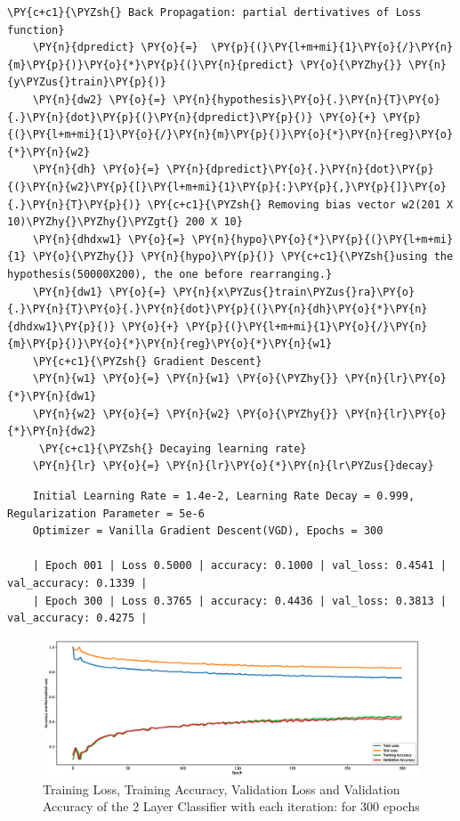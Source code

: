 \documentclass[a4paper,11pt]{article}%
\begin{document}
\begin{tcolorbox}[breakable, size=fbox, boxrule=1pt, pad at break*=1mm,colback=cellbackground, colframe=cellborder]
\begin{Verbatim}[commandchars=\\\{\}]
    \PY{c+c1}{\PYZsh{} Back Propagation: partial dertivatives of Loss function}
    \PY{n}{dpredict} \PY{o}{=}  \PY{p}{(}\PY{l+m+mi}{1}\PY{o}{/}\PY{n}{m}\PY{p}{)}\PY{o}{*}\PY{p}{(}\PY{n}{predict} \PY{o}{\PYZhy{}} \PY{n}{y\PYZus{}train}\PY{p}{)}
    \PY{n}{dw2} \PY{o}{=} \PY{n}{hypothesis}\PY{o}{.}\PY{n}{T}\PY{o}{.}\PY{n}{dot}\PY{p}{(}\PY{n}{dpredict}\PY{p}{)} \PY{o}{+} \PY{p}{(}\PY{l+m+mi}{1}\PY{o}{/}\PY{n}{m}\PY{p}{)}\PY{o}{*}\PY{n}{reg}\PY{o}{*}\PY{n}{w2}
    \PY{n}{dh} \PY{o}{=} \PY{n}{dpredict}\PY{o}{.}\PY{n}{dot}\PY{p}{(}\PY{n}{w2}\PY{p}{[}\PY{l+m+mi}{1}\PY{p}{:}\PY{p}{,}\PY{p}{]}\PY{o}{.}\PY{n}{T}\PY{p}{)} \PY{c+c1}{\PYZsh{} Removing bias vector w2(201 X 10)\PYZhy{}\PYZhy{}\PYZgt{} 200 X 10}
    \PY{n}{dhdxw1} \PY{o}{=} \PY{n}{hypo}\PY{o}{*}\PY{p}{(}\PY{l+m+mi}{1} \PY{o}{\PYZhy{}} \PY{n}{hypo}\PY{p}{)} \PY{c+c1}{\PYZsh{}using the hypothesis(50000X200), the one before rearranging.}
    \PY{n}{dw1} \PY{o}{=} \PY{n}{x\PYZus{}train\PYZus{}ra}\PY{o}{.}\PY{n}{T}\PY{o}{.}\PY{n}{dot}\PY{p}{(}\PY{n}{dh}\PY{o}{*}\PY{n}{dhdxw1}\PY{p}{)} \PY{o}{+} \PY{p}{(}\PY{l+m+mi}{1}\PY{o}{/}\PY{n}{m}\PY{p}{)}\PY{o}{*}\PY{n}{reg}\PY{o}{*}\PY{n}{w1}    
    \PY{c+c1}{\PYZsh{} Gradient Descent}
    \PY{n}{w1} \PY{o}{=} \PY{n}{w1} \PY{o}{\PYZhy{}} \PY{n}{lr}\PY{o}{*}\PY{n}{dw1}
    \PY{n}{w2} \PY{o}{=} \PY{n}{w2} \PY{o}{\PYZhy{}} \PY{n}{lr}\PY{o}{*}\PY{n}{dw2}
     \PY{c+c1}{\PYZsh{} Decaying learning rate}
    \PY{n}{lr} \PY{o}{=} \PY{n}{lr}\PY{o}{*}\PY{n}{lr\PYZus{}decay}
\end{Verbatim}
\end{tcolorbox}

\begin{verbatim}
	Initial Learning Rate = 1.4e-2, Learning Rate Decay = 0.999, Regularization Parameter = 5e-6 
	Optimizer = Vanilla Gradient Descent(VGD), Epochs = 300
	
	| Epoch 001 | Loss 0.5000 | accuracy: 0.1000 | val_loss: 0.4541 | val_accuracy: 0.1339 |
	| Epoch 300 | Loss 0.3765 | accuracy: 0.4436 | val_loss: 0.3813 | val_accuracy: 0.4275 |
\end{verbatim}


\begin{figure}[!h]
	\centering
	\includegraphics[scale=0.3]{figures/part2plots}
	\caption{\footnotesize Training Loss, Training Accuracy, Validation Loss and Validation Accuracy of the 2 Layer Classifier with each iteration:  for 300 epochs}
\end{figure}
\end{document}
